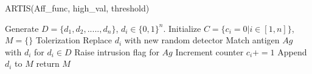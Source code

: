 \documentclass[12pt]{article}
\begin{document}
\begin{algorithm}[H]
\caption{ARTIS(Aff\_func, high\_val, threshold)}
\begin{algorithmic}[1]
\State Generate $D=\{d_1,d_2,.....,d_n\}$, $d_i\in \{0,1\}^n$.
\State Initialize $C=\{c_i = 0|i\in [1,n]\}$, $M=\{\}$
\newline \Comment Tolerization
\State Replace $d_i$ with new random detector
\EndIf
\EndFor
\EndFor
{}
\newline \Comment Match antigen $Ag$ with $d_i$ for $d_i\in D$
\State Raise intrusion flag for $Ag$
\State Increment counter $c_i+=1$
\State	Append $d_i$ to $M$
\EndIf
\EndIf
\EndFor
\EndWhile
\State return $M$

\end{algorithmic}
\end{algorithm}
\end{document}
